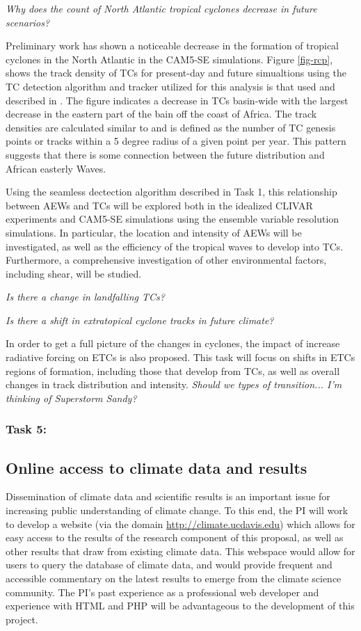 \documentclass[11pt]{article}
\begin{document}
\emph{Why does the count of North Atlantic tropical cyclones decrease in future scenarios?}

Preliminary work has shown a noticeable decrease in the formation of tropical cyclones in the North Atlantic in the CAM5-SE simulations. Figure \ref{fig-rcp}, shows the track density of TCs for present-day and future simualtions using the TC detection algorithm and tracker utilized for this analysis is that used and described in \citet{Zhao2009}. The figure indicates a decrease in TCs basin-wide with the largest decrease in the eastern part of the bain off the coast of Africa. The track densities are calculated similar to \citet{Done2013} and is defined as the number of TC genesis points or tracks within a 5 degree radius of a given point per year. This pattern suggests that there is some connection between the future distribution and African easterly Waves.

Using the seamless dectection algorithm described in Task 1, this relationship between AEWs and TCs will be explored both in the idealized CLIVAR experiments and CAM5-SE simulations using the ensemble variable resolution simulations. In particular, the location and intensity of AEWs will be investigated, as well as the efficiency of the tropical waves to develop into TCs. Furthermore, a comprehensive investigation of other environmental factors, including shear, will be studied.

\emph{Is there a change in landfalling TCs?}

\emph{Is there a shift in extratopical cyclone tracks in future climate?}

In order to get a full picture of the changes in cyclones, the impact of increase radiative forcing on ETCs is also proposed. This task will focus on shifts in ETCs regions of formation, including those that develop from TCs, as well as overall changes in track distribution and intensity. \emph{Should we types of transition... I'm thinking of Superstorm Sandy?}

\subsubsection{Task 5:}

\subsection{Online access to climate data and results}

Dissemination of climate data and scientific results is an important issue for increasing public understanding of climate change.  To this end, the PI will work to develop a website (via the domain \url{http://climate.ucdavis.edu}) which allows for easy access to the results of the research component of this proposal, as well as other results that draw from existing climate data.  This webspace would allow for users to query the database of climate data, and would provide frequent and accessible commentary on the latest results to emerge from the climate science community.  The PI's past experience as a professional web developer and experience with HTML and PHP will be advantageous to the development of this project.
\end{document}
